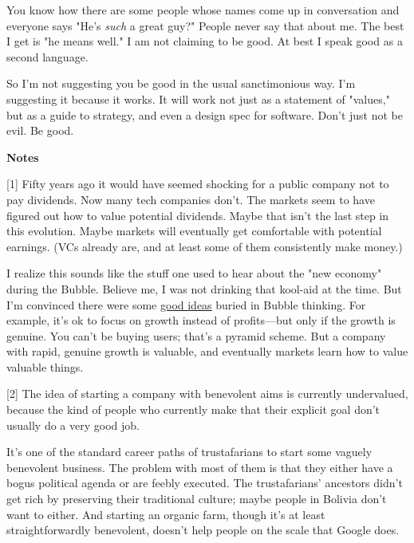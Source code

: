 You know how there are some people whose names
                  come up in conversation and everyone says "He's \emph{such} a
                  great guy?" People never say that about me. The best I get is
                  "he means well." I am not claiming to be good. At best I speak
                  good as a second language.

So I'm not suggesting
                  you be good in the usual sanctimonious way. I'm suggesting it
                  because it works. It will work not just as a statement of
                  "values," but as a guide to strategy, and even a design spec
                  for software. Don't just not be evil. Be good.





\textbf{Notes}

[1] Fifty years ago it would have seemed shocking for a public
                  company not to pay dividends. Now many tech companies don't.
                  The markets seem to have figured out how to value potential
                  dividends. Maybe that isn't the last step in this evolution.
                  Maybe markets will eventually get comfortable with potential
                  earnings. (VCs already are, and at least some of them
                  consistently make money.)

I realize this sounds
                  like the stuff one used to hear about the "new economy" during
                  the Bubble. Believe me, I was not drinking that kool-aid at
                  the time. But I'm convinced there were some
                  \href{http://www.paulgraham.com/bubble.html}{good ideas} buried in Bubble
                  thinking. For example, it's ok to focus on growth instead of
                  profits---but only if the growth is genuine. You can't be
                  buying users; that's a pyramid scheme. But a company with
                  rapid, genuine growth is valuable, and eventually markets
                  learn how to value valuable things.

[2] The idea of starting a company with benevolent aims is
                  currently undervalued, because the kind of people who
                  currently make that their explicit goal don't usually do a
                  very good job.

It's one of the standard career
                  paths of trustafarians to start some vaguely benevolent
                  business. The problem with most of them is that they either
                  have a bogus political agenda or are feebly executed. The
                  trustafarians' ancestors didn't get rich by preserving their
                  traditional culture; maybe people in Bolivia don't want to
                  either. And starting an organic farm, though it's at least
                  straightforwardly benevolent, doesn't help people on the scale
                  that Google does.


